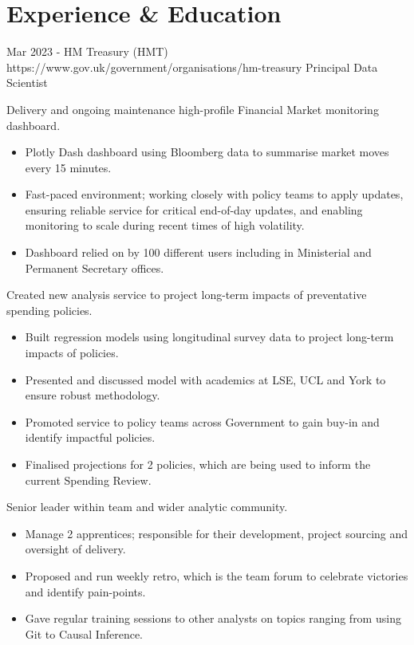 \documentclass[10pt]{article} %
\begin{document}
\section{Experience \& Education}
\job
{Mar 2023 -}{}
{HM Treasury (HMT)}
{https://www.gov.uk/government/organisations/hm-treasury}
{Principal Data Scientist}
{
  \begin{itemize-noindent}
  \item{Delivery and ongoing maintenance high-profile Financial Market monitoring dashboard.}
    \begin{itemize}
    \item{Plotly Dash dashboard using Bloomberg data to summarise market moves every 15 minutes.}
    \item{
      Fast-paced environment; working closely with policy teams to apply updates, ensuring reliable service for critical end-of-day updates,
      and enabling monitoring to scale during recent times of high volatility.
    }
    \item{Dashboard relied on by 100 different users including in Ministerial and Permanent Secretary offices.}
    \end{itemize}
    \item{Created new analysis service to project long-term impacts of preventative spending policies.}
    \begin{itemize}
    \item{Built regression models using longitudinal survey data to project long-term impacts of policies.}
    \item{Presented and discussed model with academics at LSE, UCL and York to ensure robust methodology.}
    \item{Promoted service to policy teams across Government to gain buy-in and identify impactful policies.}
    \item{Finalised projections for 2 policies, which are being used to inform the current Spending Review.}
    \end{itemize}
  \item{Senior leader within team and wider analytic community.}
    \begin{itemize}
    \item{Manage 2 apprentices; responsible for their development, project sourcing and oversight of delivery.}
    \item{Proposed and run weekly retro, which is the team forum to celebrate victories and identify pain-points.}
    \item{Gave regular training sessions to other analysts on topics ranging from using Git to Causal Inference.}
    \end{itemize}
  \end{itemize-noindent}
}
\end{document}
